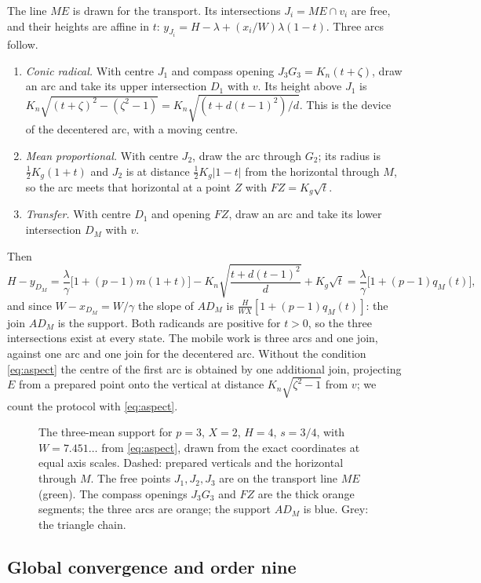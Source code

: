 The line $ME$ is drawn for the transport. Its intersections $J_i=ME\cap v_i$ are free, and their heights
are affine in $t$: $y_{J_i}=H-\lambda+(x_i/W)\lambda(1-t)$. Three arcs follow.
\begin{enumerate}[label=\arabic*.]
\item \emph{Conic radical.} With centre $J_1$ and compass opening
$J_3G_3=K_n(t+\zeta)$, draw an arc and take its upper intersection $D_1$ with $v$. Its height above
$J_1$ is $K_n\sqrt{(t+\zeta)^{2}-(\zeta^{2}-1)}=K_n\sqrt{(t+d(t-1)^{2})/d}$. This is the device of the
decentered arc, with a moving centre.
\item \emph{Mean proportional.} With centre $J_2$, draw the arc through $G_2$; its radius is
$\tfrac12K_g(1+t)$ and $J_2$ is at distance $\tfrac12K_g|1-t|$ from the horizontal through $M$, so the
arc meets that horizontal at a point $Z$ with $FZ=K_g\sqrt t$.
\item \emph{Transfer.} With centre $D_1$ and opening $FZ$, draw an arc and take its lower intersection
$D_M$ with $v$.
\end{enumerate}
Then
\[ H-y_{D_M}=\frac\lambda\gamma\bigl[1+(p-1)m(1+t)\bigr]-K_n\sqrt{\frac{t+d(t-1)^{2}}{d}}+K_g\sqrt t
=\frac\lambda\gamma\bigl[1+(p-1)q_M(t)\bigr], \]
and since $W-x_{D_M}=W/\gamma$ the slope of $AD_M$ is $\tfrac{H}{WX}[1+(p-1)q_M(t)]$: the join $AD_M$
is the support. Both radicands are positive for $t>0$, so the three intersections exist at every
state. The mobile work is three arcs and one join, against one arc and one join for the decentered arc.
Without the condition \eqref{eq:aspect} the centre of the first arc is obtained by one additional
join, projecting $E$ from a prepared point onto the vertical at distance $K_n\sqrt{\zeta^{2}-1}$ from
$v$; we count the protocol with \eqref{eq:aspect}.

\begin{figure}[h]
\centering\figMean
\caption{The three-mean support for $p=3$, $X=2$, $H=4$, $s=3/4$, with $W=7.451\ldots$ from
\eqref{eq:aspect}, drawn from the exact coordinates at equal axis scales. Dashed: prepared verticals and
the horizontal through $M$. The free points $J_1,J_2,J_3$ are on the transport line $ME$ (green). The
compass openings $J_3G_3$ and $FZ$ are the thick orange segments; the three arcs are orange; the support
$AD_M$ is blue. Grey: the triangle chain.}\label{fig:mean}
\end{figure}

\subsection{Global convergence and order nine}

